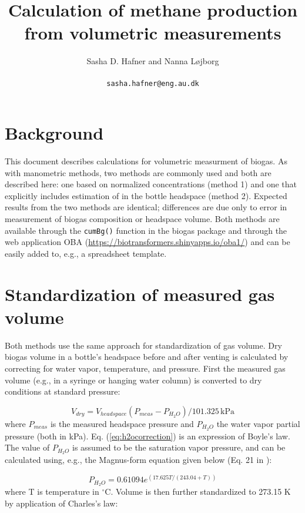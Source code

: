 \documentclass[]{article}
\title {Calculation of methane production from volumetric measurements}
\author{Sasha D. Hafner and Nanna L\o jborg \\
\\
\texttt{sasha.hafner@eng.au.dk}
}
\newcommand{\unit}[1]{\ensuremath{\, \mathrm{#1}}}
\begin{document}
\maketitle

\section{Background}
This document describes calculations for volumetric measurment of biogas.
As with manometric methods, two methods are commonly used and both are described here: one based on normalized  concentrations (method 1) and one that explicitly includes estimation of  in the bottle headspace (method 2).
Expected results from the two methods are identical; differences are due only to error in measurement of biogas composition or headspace volume.
Both methods are available through the \texttt{cumBg()} function in the biogas package \cite{softwarex} and through the web application OBA (\url{https://biotransformers.shinyapps.io/oba1/}) and can be easily added to, e.g., a spreadsheet template.

\section{Standardization of measured gas volume}
Both methods use the same approach for standardization of gas volume.
Dry biogas volume in a bottle's headspace before and after venting is calculated by correcting for water vapor, temperature, and pressure.
First the measured gas volume (e.g., in a syringe or hanging water column) is converted to dry conditions at standard pressure:

\begin{equation}
  \label{eq:h2ocorrection}
  V_{dry} = V_{headspace}(P_{meas} - P_{H_2O})/101.325 \unit{kPa}
\end{equation}
where $P_{meas}$ is the measured headspace pressure and $P_{H_2O}$ the water vapor partial pressure (both in kPa).
Eq. (\ref{eq:h2ocorrection}) is an expression of Boyle's law.
The value of $P_{H_2O}$ is assumed to be the saturation vapor pressure, and can be calculated using, e.g., the Magnus-form equation given below (Eq. 21 in \cite{magnus}):

\begin{equation}
\label{eq:magnus}
   P_{H_2O} = 0.61094 e^{(17.625 T/(243.04 + T))}
\end{equation}
where T is temperature in $^\circ$C.
Volume is then further standardized to 273.15 K by application of Charles's law:
\end{document}
